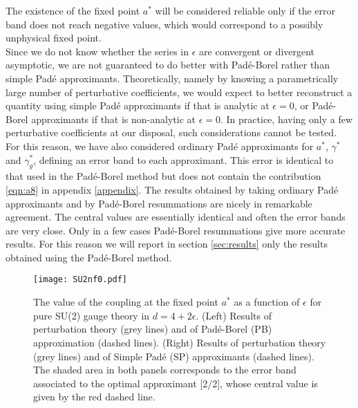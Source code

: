 \documentclass [11pt]{article}
\makeatletter
\def\section{\@startsection {section}{1}{\z@}{-3.5ex plus -1ex minus
 -.2ex}{2.3ex plus .2ex}{\large\bf}}
\makeatother
\begin{document}
The existence of the fixed point $a^*$ will be considered reliable only if the error band does not reach negative values, which would correspond to a possibly unphysical fixed point.  \\
Since we do not know whether the series in $\epsilon$ are convergent or divergent asymptotic, we are not guaranteed to do better with Pad\'e-Borel rather than simple Pad\'e approximants.
Theoretically, namely by knowing a parametrically large number of perturbative coefficients, we would expect to better reconstruct a quantity using simple Pad\'e approximants if that is analytic
at $\epsilon=0$, or Pad\'e-Borel approximants if that is non-analytic at $\epsilon=0$. In practice, having only a few perturbative coefficients at our disposal, such considerations cannot be tested.
For this reason, we have also considered ordinary Pad\'e approximants for $a^*$, $\gamma^*$ and $\gamma_g^*$, defining an error band to each approximant. This error is identical 
to that used in the Pad\'e-Borel method but does not contain the contribution \eqref{eqn:a8} in appendix \ref{appendix}. 
The results obtained by taking ordinary Pad\'e approximants and by Pad\'e-Borel resummations are nicely in remarkable agreement. The central values are essentially identical and often the error bands are 
very close. Only in a few cases Pad\'e-Borel resummations give more accurate results. For this reason we will report in section \ref{sec:results} only the results obtained using the Pad\'e-Borel method.

\begin{figure}[t!]
 \centering
\texttt{[image: SU2nf0.pdf]} 
\caption{The value of the coupling at the fixed point $a^*$ as a function of $\epsilon$  for pure SU(2) gauge theory in $d=4+2\epsilon$. (Left) Results of perturbation theory (grey lines) and of Pad\'e-Borel (PB) approximation (dashed lines). (Right) Results of perturbation theory (grey lines) and of Simple Pad\'e (SP) approximants (dashed lines). The shaded area in both panels corresponds to the  error band associated to the optimal approximant [2/2], whose central value is given by the red dashed line.}
 \label{fig:pure_su2}
\end{figure}	

\section{Results}
\label{sec:results}
\end{document}
